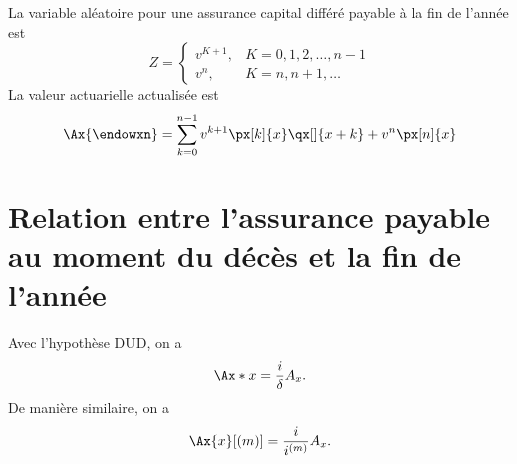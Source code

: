 \begin{definition}{}{}
	La variable aléatoire pour une assurance capital différé payable à la fin de l'année est 
	$$Z = \begin{cases}
	v^{K + 1}, & K = 0, 1, 2, \dots, n-1\\
	v^n, & K = n, n+1, \dots
	\end{cases}$$
	La valeur actuarielle actualisée est 
	$$\Ax{\endowxn} = \sum_{k = 0}^{n-1}v^{k+1}\px[k]{x}\qx[]{x+k} + v^n \px[n]{x}$$
\end{definition}

\section{Relation entre l'assurance payable au moment du décès et la fin de l'année}

Avec l'hypothèse DUD, on a 
$$\Ax*{x} = \frac{i}{\delta}A_x.$$
De manière similaire, on a 
$$\Ax{x}[(m)] = \frac{i}{i^{(m)}}A_x.$$















